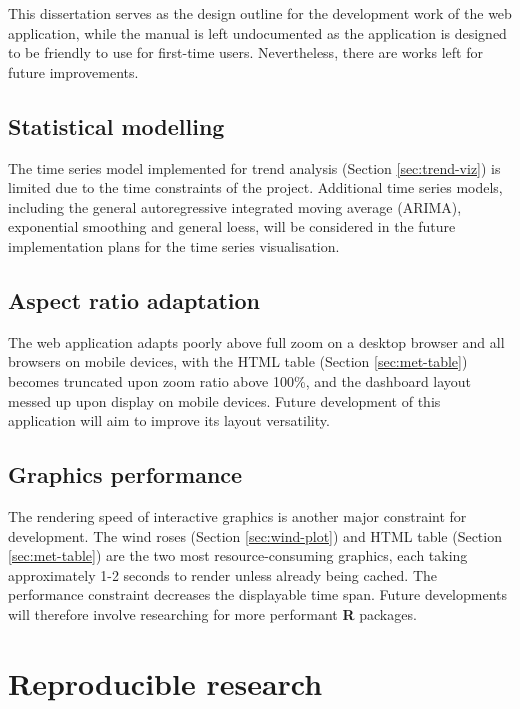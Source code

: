 \documentclass{aucklandthesis}
\begin{document}
This dissertation serves as the design outline for the development work of the web application, while the manual is left undocumented as the application is designed to be friendly to use for first-time users. Nevertheless, there are works left for future improvements.

\hypertarget{statistical-modelling}{%
\subsection{Statistical modelling}\label{statistical-modelling}}

The time series model implemented for trend analysis (Section \ref{sec:trend-viz}) is limited due to the time constraints of the project. Additional time series models, including the general autoregressive integrated moving average (ARIMA), exponential smoothing and general loess, will be considered in the future implementation plans for the time series visualisation.

\hypertarget{aspect-ratio-adaptation}{%
\subsection{Aspect ratio adaptation}\label{aspect-ratio-adaptation}}

The web application adapts poorly above full zoom on a desktop browser and all browsers on mobile devices, with the HTML table (Section \ref{sec:met-table}) becomes truncated upon zoom ratio above 100\%, and the dashboard layout messed up upon display on mobile devices. Future development of this application will aim to improve its layout versatility.

\hypertarget{graphics-performance}{%
\subsection{Graphics performance}\label{graphics-performance}}

The rendering speed of interactive graphics is another major constraint for development. The wind roses (Section \ref{sec:wind-plot}) and HTML table (Section \ref{sec:met-table}) are the two most resource-consuming graphics, each taking approximately 1-2 seconds to render unless already being cached. The performance constraint decreases the displayable time span. Future developments will therefore involve researching for more performant \textbf{R} packages.

\hypertarget{reproducible-research}{%
\section{Reproducible research}\label{reproducible-research}}
\end{document}

